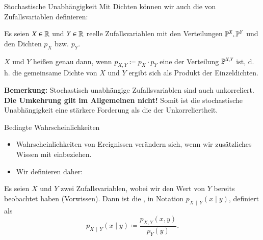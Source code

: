 \begin{frame}{Stochastische Unabhängigkeit}{}
	Mit Dichten können wir auch die  von Zufallsvariablen definieren:
	
	\begin{mydef}
		Es seien $X \in \mathbb{R}$ und $Y \in \mathbb{R}$ reelle Zufallsvariablen mit den Verteilungen $\mathbb{P}^X, \mathbb{P}^Y$
		und den Dichten $p_X$ bzw. $p_Y$.

		$X$ und $Y$ heißen  genau dann, wenn $p_{X, Y} \coloneqq p_X \cdot p_Y$
		eine  der Verteilung $\mathbb{P}^{X, Y}$ ist, d.\,h. die gemeinsame Dichte von $X$ und $Y$
		ergibt sich als Produkt der Einzeldichten. 
	\end{mydef}

	\begin{boxGray}
		\textbf{Bemerkung:} Stochastisch unabhängige Zufallsvariablen sind auch unkorreliert.
		\textbf{Die Umkehrung gilt im Allgemeinen nicht!}
		Somit ist die stochastische Unabhängigkeit eine stärkere Forderung als die der Unkorreliertheit.
	\end{boxGray}
\end{frame}


\begin{frame}{Bedingte Wahrscheinlichkeiten}{}
	\begin{itemize}
		\item Wahrscheinlichkeiten von Ereignissen verändern sich, wenn wir zusätzliches Wissen mit einbeziehen.
		\item Wir definieren daher:
	\end{itemize}
	\begin{mydef}
		Es seien $X$ und $Y$ zwei Zufallsvariablen, wobei wir den Wert von $Y$ bereits beobachtet haben (Vorwissen).
		Dann ist die , in Notation $p_{X\,\mid\,Y}(x \mid y)$,
		definiert als
		\begin{equation*}
			p_{X\,\mid\,Y}(x \mid y) \coloneqq \frac{p_{X, Y}(x, y)}{p_Y(y)}.
		\end{equation*}
	\end{mydef}
\end{frame}


